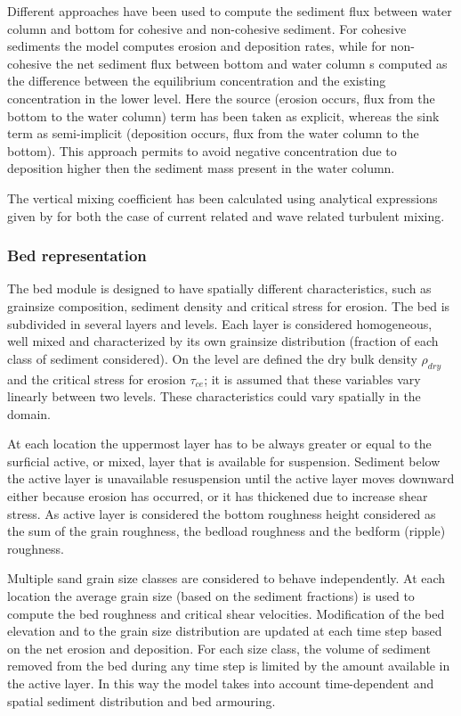 Different approaches have been used to compute the sediment flux 
between water column and bottom for cohesive and non-cohesive sediment.
For cohesive sediments the model computes erosion and deposition rates,
while for non-cohesive the net sediment flux between bottom and water 
column s computed as the difference between the equilibrium
concentration and the existing concentration in the lower level.
Here the source (erosion occurs, flux from the bottom to the water 
column) term has been taken as explicit, whereas the sink term as 
semi-implicit (deposition occurs, flux from the water column to 
the bottom). This approach permits to avoid negative concentration 
due to deposition higher then the sediment mass present in the water 
column.

The vertical mixing coefficient has been calculated  using analytical
expressions given by \cite{vanrijn93:prin} for both the case of current
related and wave related turbulent mixing.

\subsubsection{Bed representation}
The bed module is designed to have spatially different characteristics, such 
as grainsize composition, sediment density and critical stress for erosion.
The bed is subdivided in several layers and levels. Each layer is considered
homogeneous, well mixed and characterized by its own grainsize distribution
(fraction of each class of sediment considered). On the level are defined
the dry bulk density $\rho_{dry}$ and the critical stress for erosion
$\tau_{ce}$; it is assumed that these variables vary linearly between two
levels. These characteristics could vary spatially in the domain.

At each location the uppermost layer has to be always greater or equal to
the surficial active, or mixed, layer that is available for suspension.
Sediment below the active layer is unavailable resuspension until the 
active layer moves downward either because erosion has occurred, or it 
has thickened due to increase shear stress. As active layer is considered 
the bottom roughness height considered as the sum of the grain roughness, 
the bedload roughness and the bedform (ripple) roughness.

Multiple sand grain size classes are considered to behave independently. At
each location the average grain size (based on the sediment fractions) is
used to compute the bed roughness and critical shear velocities.
Modification of the bed elevation and to the grain size distribution are
updated at each time step based on the net erosion and deposition.
For each size class, the volume of sediment removed from the bed during any
time step is limited by the amount available in the active layer. In this
way the model takes into account time-dependent and spatial sediment
distribution and bed armouring.

